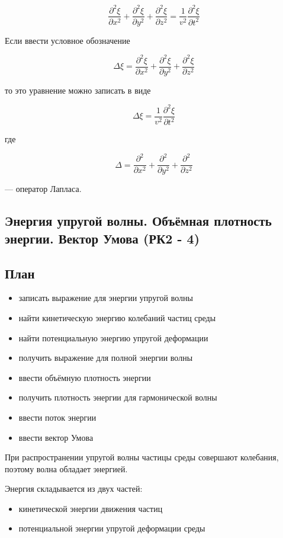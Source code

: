 \documentclass[a4paper,12pt]{article}
\begin{document}
\[
\frac{\partial^2 \xi}{\partial x^2}
+
\frac{\partial^2 \xi}{\partial y^2}
+
\frac{\partial^2 \xi}{\partial z^2}
=
\frac{1}{v^2}\frac{\partial^2 \xi}{\partial t^2}
\]

Если ввести условное обозначение

\[
\Delta \xi =
\frac{\partial^2 \xi}{\partial x^2}
+
\frac{\partial^2 \xi}{\partial y^2}
+
\frac{\partial^2 \xi}{\partial z^2}
\]

то это уравнение можно записать в виде

\[
\Delta \xi = \frac{1}{v^2}\frac{\partial^2 \xi}{\partial t^2}
\]

где

\[
\Delta =
\frac{\partial^2}{\partial x^2}
+
\frac{\partial^2}{\partial y^2}
+
\frac{\partial^2}{\partial z^2}
\]

— оператор Лапласа.

\subsection{Энергия упругой волны. Объёмная плотность энергии. Вектор Умова (РК2 - 4)}

\subsection*{План}
\begin{itemize}
\item записать выражение для энергии упругой волны
\item найти кинетическую энергию колебаний частиц среды
\item найти потенциальную энергию упругой деформации
\item получить выражение для полной энергии волны
\item ввести объёмную плотность энергии
\item получить плотность энергии для гармонической волны
\item ввести поток энергии
\item ввести вектор Умова
\end{itemize}

При распространении упругой волны частицы среды совершают колебания, поэтому волна обладает энергией.

Энергия складывается из двух частей:

\begin{itemize}
\item кинетической энергии движения частиц
\item потенциальной энергии упругой деформации среды
\end{itemize}
\end{document}
